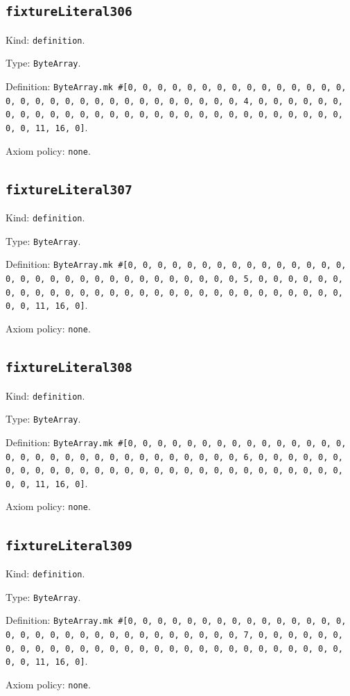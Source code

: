 \documentclass[11pt]{article}
\begin{document}
\subsection*{\texttt{fixtureLiteral306}}
\noindent Kind: \texttt{definition}.\par
\noindent Type: \texttt{ByteArray}.\par
\noindent Definition: \texttt{ByteArray.mk \#[0, 0, 0, 0, 0, 0, 0, 0, 0, 0, 0, 0, 0, 0, 0, 0, 0, 0, 0, 0, 0, 0, 0, 0, 0, 0, 0, 0, 0, 0, 0, 4, 0, 0, 0, 0, 0, 0, 0, 0, 0, 0, 0, 0, 0, 0, 0, 0, 0, 0, 0, 0, 0, 0, 0, 0, 0, 0, 0, 0, 0, 0, 0, 11, 16, 0]}.\par
\noindent Axiom policy: \texttt{none}.\par
\subsection*{\texttt{fixtureLiteral307}}
\noindent Kind: \texttt{definition}.\par
\noindent Type: \texttt{ByteArray}.\par
\noindent Definition: \texttt{ByteArray.mk \#[0, 0, 0, 0, 0, 0, 0, 0, 0, 0, 0, 0, 0, 0, 0, 0, 0, 0, 0, 0, 0, 0, 0, 0, 0, 0, 0, 0, 0, 0, 0, 5, 0, 0, 0, 0, 0, 0, 0, 0, 0, 0, 0, 0, 0, 0, 0, 0, 0, 0, 0, 0, 0, 0, 0, 0, 0, 0, 0, 0, 0, 0, 0, 11, 16, 0]}.\par
\noindent Axiom policy: \texttt{none}.\par
\subsection*{\texttt{fixtureLiteral308}}
\noindent Kind: \texttt{definition}.\par
\noindent Type: \texttt{ByteArray}.\par
\noindent Definition: \texttt{ByteArray.mk \#[0, 0, 0, 0, 0, 0, 0, 0, 0, 0, 0, 0, 0, 0, 0, 0, 0, 0, 0, 0, 0, 0, 0, 0, 0, 0, 0, 0, 0, 0, 0, 6, 0, 0, 0, 0, 0, 0, 0, 0, 0, 0, 0, 0, 0, 0, 0, 0, 0, 0, 0, 0, 0, 0, 0, 0, 0, 0, 0, 0, 0, 0, 0, 11, 16, 0]}.\par
\noindent Axiom policy: \texttt{none}.\par
\subsection*{\texttt{fixtureLiteral309}}
\noindent Kind: \texttt{definition}.\par
\noindent Type: \texttt{ByteArray}.\par
\noindent Definition: \texttt{ByteArray.mk \#[0, 0, 0, 0, 0, 0, 0, 0, 0, 0, 0, 0, 0, 0, 0, 0, 0, 0, 0, 0, 0, 0, 0, 0, 0, 0, 0, 0, 0, 0, 0, 7, 0, 0, 0, 0, 0, 0, 0, 0, 0, 0, 0, 0, 0, 0, 0, 0, 0, 0, 0, 0, 0, 0, 0, 0, 0, 0, 0, 0, 0, 0, 0, 11, 16, 0]}.\par
\noindent Axiom policy: \texttt{none}.\par
\end{document}
